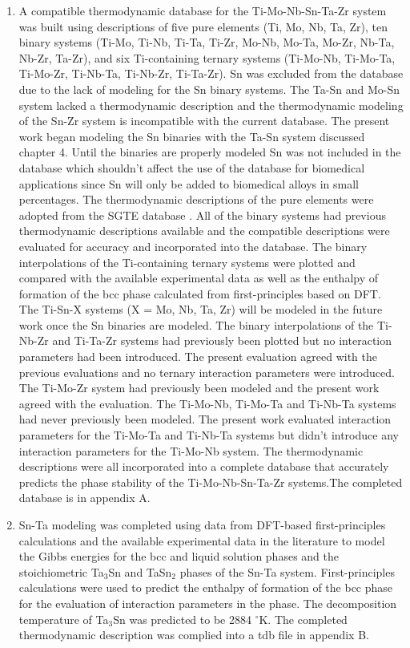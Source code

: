 \begin{enumerate}
	\item A compatible thermodynamic database for the Ti-Mo-Nb-Sn-Ta-Zr system was built using descriptions of five pure elements (Ti, Mo, Nb, Ta, Zr), ten binary systems (Ti-Mo, Ti-Nb, Ti-Ta, Ti-Zr, Mo-Nb, Mo-Ta, Mo-Zr, Nb-Ta, Nb-Zr, Ta-Zr), and six Ti-containing ternary systems (Ti-Mo-Nb, Ti-Mo-Ta, Ti-Mo-Zr, Ti-Nb-Ta, Ti-Nb-Zr, Ti-Ta-Zr). Sn was excluded from the database due to the lack of modeling for the Sn binary systems. The Ta-Sn and Mo-Sn system lacked a thermodynamic description and the thermodynamic modeling of the Sn-Zr system is incompatible with the current database. The present work began modeling the Sn binaries with the Ta-Sn system discussed chapter 4. Until the binaries are properly modeled Sn was not included in the database which shouldn't affect the use of the database for biomedical applications since Sn will only be added to biomedical alloys in small percentages. The thermodynamic descriptions of the pure elements were adopted from the SGTE database \cite{Dinsdale1991}. All of the binary systems had previous thermodynamic descriptions available and the compatible descriptions were evaluated for accuracy and incorporated into the database. The binary interpolations of the Ti-containing ternary systems were plotted and compared with the available experimental data as well as the enthalpy of formation of the bcc phase calculated from first-principles based on DFT. The Ti-Sn-X systems (X = Mo, Nb, Ta, Zr) will be modeled in the future work once the Sn binaries are modeled. The binary interpolations of the Ti-Nb-Zr and Ti-Ta-Zr systems had previously been plotted but no interaction parameters had been introduced. The present evaluation agreed with the previous evaluations and no ternary interaction parameters were introduced. The Ti-Mo-Zr system had previously been modeled and the present work agreed with the evaluation. The Ti-Mo-Nb, Ti-Mo-Ta and Ti-Nb-Ta systems had never previously been modeled. The present work evaluated interaction parameters for the Ti-Mo-Ta and Ti-Nb-Ta systems but didn't introduce any interaction parameters for the Ti-Mo-Nb system. The thermodynamic descriptions were all incorporated into a complete database that accurately predicts the phase stability of the Ti-Mo-Nb-Sn-Ta-Zr systems.The completed database is in appendix A. 
	\item Sn-Ta modeling was completed using data from DFT-based first-principles calculations and the available experimental data in the literature to model the Gibbs energies for the bcc and liquid solution phases and the stoichiometric Ta$_3$Sn and TaSn$_2$ phases of the Sn-Ta system. First-principles calculations were used to predict the enthalpy of formation of the bcc phase for the evaluation of interaction parameters in the phase. The decomposition temperature of Ta$_3$Sn was predicted to be 2884 $^\circ$K. The completed thermodynamic description was complied into a tdb file in appendix B.

\end{enumerate}
